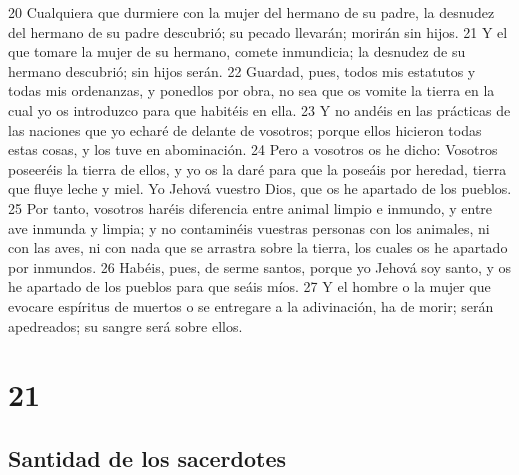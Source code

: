 20 Cualquiera que durmiere con la mujer del hermano de su padre, la desnudez del hermano de su padre descubrió; su pecado llevarán; morirán sin hijos.
21 Y el que tomare la mujer de su hermano, comete inmundicia; la desnudez de su hermano descubrió; sin hijos serán.
22 Guardad, pues, todos mis estatutos y todas mis ordenanzas, y ponedlos por obra, no sea que os vomite la tierra en la cual yo os introduzco para que habitéis en ella.
23 Y no andéis en las prácticas de las naciones que yo echaré de delante de vosotros; porque ellos hicieron todas estas cosas, y los tuve en abominación.
24 Pero a vosotros os he dicho: Vosotros poseeréis la tierra de ellos, y yo os la daré para que la poseáis por heredad, tierra que fluye leche y miel. Yo Jehová vuestro Dios, que os he apartado de los pueblos.
25 Por tanto, vosotros haréis diferencia entre animal limpio e inmundo, y entre ave inmunda y limpia; y no contaminéis vuestras personas con los animales, ni con las aves, ni con nada que se arrastra sobre la tierra, los cuales os he apartado por inmundos.
26 Habéis, pues, de serme santos, porque yo Jehová soy santo, y os he apartado de los pueblos para que seáis míos.
27 Y el hombre o la mujer que evocare espíritus de muertos o se entregare a la adivinación, ha de morir; serán apedreados; su sangre será sobre ellos.  

\chapter{21}

\section{Santidad de los sacerdotes}

